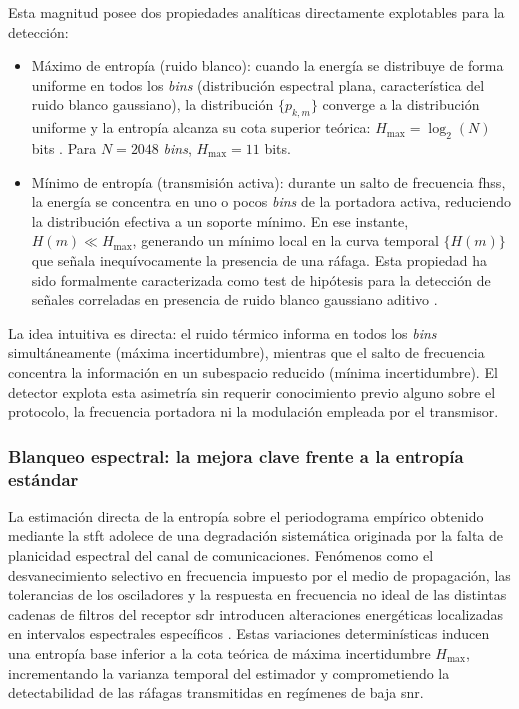 Esta magnitud posee dos propiedades analíticas directamente explotables para la detección:

\begin{itemize}\itemsep 0em
    \item Máximo de entropía (ruido blanco): cuando la energía se distribuye de forma uniforme en todos los \textit{bins} (distribución espectral plana, característica del ruido blanco gaussiano), la distribución $\{p_{k,m}\}$ converge a la distribución uniforme y la entropía alcanza su cota superior teórica: $H_{\max} = \log_2(N)$ bits \cite{cover_elements_2006}. Para $N = 2048$ \textit{bins}, $H_{\max} = 11$ bits.

    \item Mínimo de entropía (transmisión activa): durante un salto de frecuencia \gls{fhss}, la energía se concentra en uno o pocos \textit{bins} de la portadora activa, reduciendo la distribución efectiva a un soporte mínimo. En ese instante, $H(m) \ll H_{\max}$, generando un mínimo local en la curva temporal $\{H(m)\}$ que señala inequívocamente la presencia de una ráfaga. Esta propiedad ha sido formalmente caracterizada como test de hipótesis para la detección de señales correladas en presencia de ruido blanco gaussiano aditivo \cite{zhang_entropy-based_1989}.
\end{itemize}

La idea intuitiva es directa: el ruido térmico informa en todos los \textit{bins} simultáneamente (máxima incertidumbre), mientras que el salto de frecuencia concentra la información en un subespacio reducido (mínima incertidumbre). El detector explota esta asimetría sin requerir conocimiento previo alguno sobre el protocolo, la frecuencia portadora ni la modulación empleada por el transmisor.

\subsubsection{Blanqueo espectral: la mejora clave frente a la entropía estándar}
\label{subsubsec:whitening}

La estimación directa de la entropía sobre el periodograma empírico obtenido mediante la \gls{stft} adolece de una degradación sistemática originada por la falta de planicidad espectral del canal de comunicaciones. Fenómenos como el desvanecimiento selectivo en frecuencia impuesto por el medio de propagación, las tolerancias de los osciladores y la respuesta en frecuencia no ideal de las distintas cadenas de filtros del receptor \gls{sdr} introducen alteraciones energéticas localizadas en intervalos espectrales específicos \cite{tandra_snr_2008}. Estas variaciones determinísticas inducen una entropía base inferior a la cota teórica de máxima incertidumbre $H_{\max}$, incrementando la varianza temporal del estimador y comprometiendo la detectabilidad de las ráfagas transmitidas en regímenes de baja \gls{snr}.

